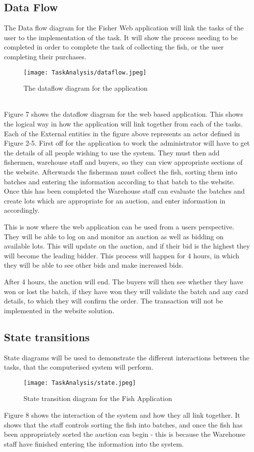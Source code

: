 \documentclass{article}
\begin{document}
\subsection{Data Flow}
\noindent The Data flow diagram for the Fisher Web application will link the tasks of the user to the implementation of the task. It will show the process needing to be completed in order to complete the task of collecting the fish, or the user completing their purchases.
\begin{figure}[htp]
\centering
\texttt{[image: TaskAnalysis/dataflow.jpeg]}
\caption{The dataflow diagram for the application}
\label{}
\end{figure}
\\\noindent Figure 7 shows the dataflow diagram for the web based application. This shows the logical way in how the application will link together from each of the tasks. Each of the External entities in the figure above represents an actor defined in Figure 2-5. First off for the application to work the administrator will have to get the details of all people wishing to use the system. They must then add fishermen, warehouse staff and buyers, so they can view appropriate sections of the website. Afterwards the fisherman must collect the fish, sorting them into batches and entering the information according to that batch to the website. Once this has been completed the Warehouse staff can evaluate the batches and create lots which are appropriate for an auction, and enter information in accordingly. 

This is now where the web application can be used from a users perspective. They will be able to log on and monitor an auction as well as bidding on  available lots. This will update on the auction, and if their bid is the highest they will become the leading bidder. This process will happen for 4 hours, in which they will be able to see other bids and make increased bids. 

After 4 hours, the auction will end. The buyers will then see whether they have won or lost the batch, if they have won they will validate the batch and any card details, to which they will confirm the order. The transaction will not be implemented in the website solution.
\subsection{State transitions}
State diagrams will be used to demonstrate the different interactions between the tasks, that the computerised system will perform.
\begin{figure}[htp]
\centering
\texttt{[image: TaskAnalysis/state.jpeg]}
\caption{State transition diagram for the Fish Application}
\label{} 
\end{figure}
\noindent Figure 8 shows the interaction of the system and how they all link together. It shows that the staff controls sorting the fish into batches, and once the fish has been appropriately sorted the auction can begin - this is because the Warehouse staff have finished entering the information into the system. 
\end{document}
